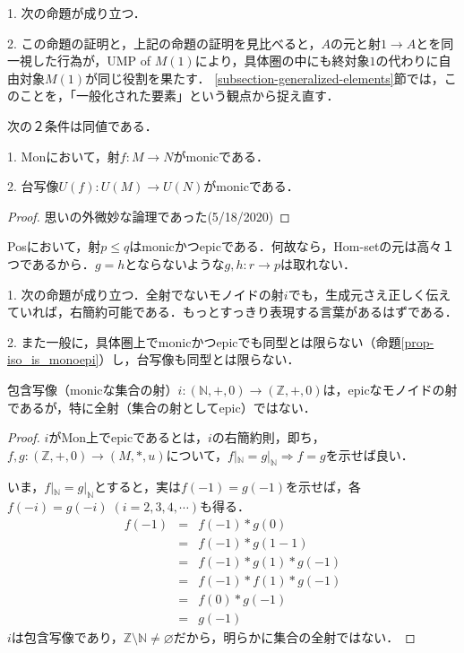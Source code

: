 \documentclass[uplatex, 12pt, dvipdfmx]{jsarticle}
\begin{document}
\begin{example}
    1. 次の命題が成り立つ．
    
    2. この命題の証明と，上記の命題の証明を見比べると，$A$の元と射$1\to A$とを同一視した行為が，UMP of $M(1)$により，具体圏の中にも終対象$1$の代わりに自由対象$M(1)$が同じ役割を果たす．
    \ref{subsection-generalized-elements}節では，このことを，「一般化された要素」という観点から捉え直す．
\end{example}

\begin{proposition*}次の２条件は同値である．

    1. Monにおいて，射$f:M\to N$がmonicである．
    
    2. 台写像$U(f):U(M)\to U(N)$がmonicである．
\end{proposition*}
\begin{proof}
    思いの外微妙な論理であった(5/18/2020)
\end{proof}

\begin{example}
    Posにおいて，射$p\le q$はmonicかつepicである．何故なら，Hom-setの元は高々１つであるから．$g=h$とならないような$g,h:r\to p$は取れない．
\end{example}

\begin{example}\label{example-epis-notnecessarily-surjective}
    1. 次の命題が成り立つ．全射でないモノイドの射$i$でも，生成元さえ正しく伝えていれば，右簡約可能である．もっとすっきり表現する言葉があるはずである．

    2. また一般に，具体圏上でmonicかつepicでも同型とは限らない（命題\ref{prop-iso_is_monoepi}）し，台写像も同型とは限らない．
    \begin{proposition*}[全写でないモノイドのepic射]
        包含写像（monicな集合の射）$i:(\mathbb{N},+,0)\to(\mathbb{Z},+,0)$は，epicなモノイドの射であるが，特に全射（集合の射としてepic）ではない．
    \end{proposition*}
    \begin{proof}
        $i$がMon上でepicであるとは，$i$の右簡約則，即ち，$f,g:(\mathbb{Z},+,0)\to (M,*,u)$について，$f|_\mathbb{N}=g|_\mathbb{N}\Rightarrow f=g$を示せば良い．

        いま，$f|_\mathbb{N}=g|_\mathbb{N}$とすると，実は$f(-1)=g(-1)$を示せば，各$f(-i)=g(-i)\; (i=2,3,4,\cdots)$も得る．
        \begin{eqnarray*}
            f(-1) &=& f(-1)*g(0) \\
            &=& f(-1)*g(1-1) \\
            &=& f(-1)*g(1)*g(-1) \\
            &=& f(-1)*f(1)*g(-1) \\
            &=& f(0)*g(-1) \\
            &=& g(-1)
        \end{eqnarray*}
        $i$は包含写像であり，$\mathbb{Z}\setminus\mathbb{N}\ne\varnothing$だから，明らかに集合の全射ではない．
    \end{proof}
\end{example}
\end{document}
